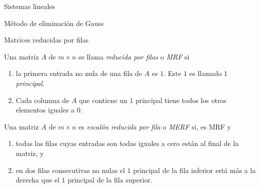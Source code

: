 \begin{chapter}{Sistemas lineales}
\begin{section}{Método de eliminación de Gauss }
\begin{subsection}{Matrices reducidas por filas}
                \begin{definicion}
                    Una matriz $A$ de $m \times n$ se llama \textit{reducida por filas} o \textit{MRF} si 
                    \begin{enumerate}[label=\textit{\alph*)}, ref=\textit{\alph*)}]
                        \item la primera entrada no nula de una fila de $A$ es $1$. Este $1$ es llamado \textit{$1$ principal}.
                        \item Cada columna de $A$ que contiene un  $1$ principal tiene todos los otros elementos iguales a 0. 
                    \end{enumerate} 
                Una matriz $A$ de $m \times n$ es \textit{escalón reducida por fila} o \textit{MERF} si,  es  MRF y
                \begin{enumerate}[resume*]
                    \item todas las filas cuyas entradas son todas iguales a cero están al final de la matriz, y
                    \item en dos filas consecutivas no nulas el $1$ principal de la fila inferior está más a la derecha que el $1$ principal de la fila superior. 
                \end{enumerate}
                
                \end{definicion} 
                

\end{subsection}
\end{section}
\end{chapter}
